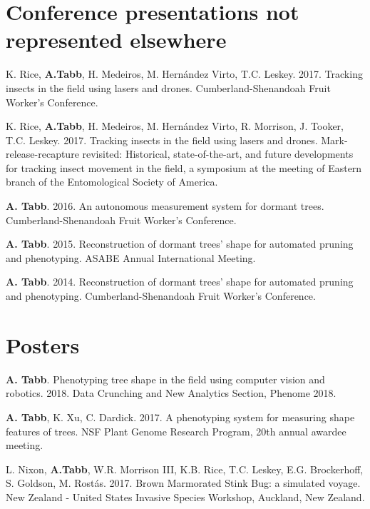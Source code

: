 \documentclass[letterpaper,11pt]{article}
\begin{document}
\section{Conference presentations not represented elsewhere}
\begin{enumerate}[noitemsep, leftmargin=*,label={[\arabic*]}]
\item{K. Rice, \textbf{A.Tabb}, H. Medeiros, M. Hern{\'a}ndez Virto, T.C. Leskey. 2017. Tracking insects in the field using lasers and drones. Cumberland-Shenandoah Fruit Worker's Conference. } 

\item{ K. Rice, \textbf{A.Tabb}, H. Medeiros, M. Hern{\'a}ndez Virto, R. Morrison, J. Tooker,  T.C. Leskey. 2017. Tracking insects in the field using lasers and drones. Mark-release-recapture revisited: Historical, state-of-the-art, and future developments for tracking insect movement in the field, a symposium at the meeting of Eastern branch of the Entomological Society of America.}

\item{ \textbf{A. Tabb}. 2016. An autonomous measurement system for dormant trees. Cumberland-Shenandoah Fruit Worker's Conference.}

\item{ \textbf{A. Tabb}. 2015. Reconstruction of dormant trees' shape for automated pruning and phenotyping. ASABE Annual International Meeting.}

\item{ \textbf{A. Tabb}. 2014. Reconstruction of dormant trees' shape for automated pruning and phenotyping. Cumberland-Shenandoah Fruit Worker's Conference.}
\end{enumerate}


\section{Posters}
\begin{enumerate}[noitemsep, leftmargin=*,label={[\arabic*]}]
\item{\textbf{A. Tabb}. Phenotyping tree shape in the field using computer vision and robotics. 2018. Data Crunching and New Analytics Section, Phenome 2018.}

\item{\textbf{A. Tabb}, K. Xu, C. Dardick.  2017. A phenotyping system for measuring shape features of trees. NSF Plant Genome Research Program, 20th annual awardee meeting. }

\item{L. Nixon, \textbf{A.Tabb}, W.R. Morrison III, K.B. Rice, T.C. Leskey, E.G. Brockerhoff, S. Goldson, M. Rost\'{a}s.  2017. Brown Marmorated Stink Bug: a simulated voyage. New Zealand - United States Invasive Species Workshop, Auckland, New Zealand. }
\end{enumerate}
\end{document}
